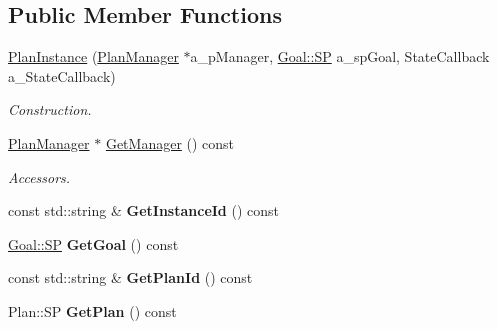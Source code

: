 \subsection*{Public Member Functions}
\begin{DoxyCompactItemize}
\item 
\mbox{\label{class_plan_instance_a74cdd19349519898ff334433731a9c79}} 
\hyperlink{class_plan_instance_a74cdd19349519898ff334433731a9c79}{Plan\+Instance} (\hyperlink{class_plan_manager}{Plan\+Manager} $\ast$a\+\_\+p\+Manager, \hyperlink{class_goal_a818ae12a4d1f28bd433dab2a830a390e}{Goal\+::\+SP} a\+\_\+sp\+Goal, State\+Callback a\+\_\+\+State\+Callback)
\begin{DoxyCompactList}\small\item\em Construction. \end{DoxyCompactList}\item 
\mbox{\label{class_plan_instance_a9e0be799d35bde5deebbc311db47318c}} 
\hyperlink{class_plan_manager}{Plan\+Manager} $\ast$ \hyperlink{class_plan_instance_a9e0be799d35bde5deebbc311db47318c}{Get\+Manager} () const
\begin{DoxyCompactList}\small\item\em Accessors. \end{DoxyCompactList}\item 
\mbox{\label{class_plan_instance_ac8127fe003f0e555a9229a8ecf59d5d3}} 
const std\+::string \& {\bfseries Get\+Instance\+Id} () const
\item 
\mbox{\label{class_plan_instance_aa716f1c87f9478eede96041ab6da16ed}} 
\hyperlink{class_goal_a818ae12a4d1f28bd433dab2a830a390e}{Goal\+::\+SP} {\bfseries Get\+Goal} () const
\item 
\mbox{\label{class_plan_instance_a6d2cced91642018d67baf014fb3722cf}} 
const std\+::string \& {\bfseries Get\+Plan\+Id} () const
\item 
\mbox{\label{class_plan_instance_ae91f9dccb8f9593358ec91dc34921c92}} 
Plan\+::\+SP {\bfseries Get\+Plan} () const
\item 
\mbox{\label{class_plan_instance_abf3f6010f01fd60c283b23a6c56051be}} 

\end{DoxyCompactItemize}
